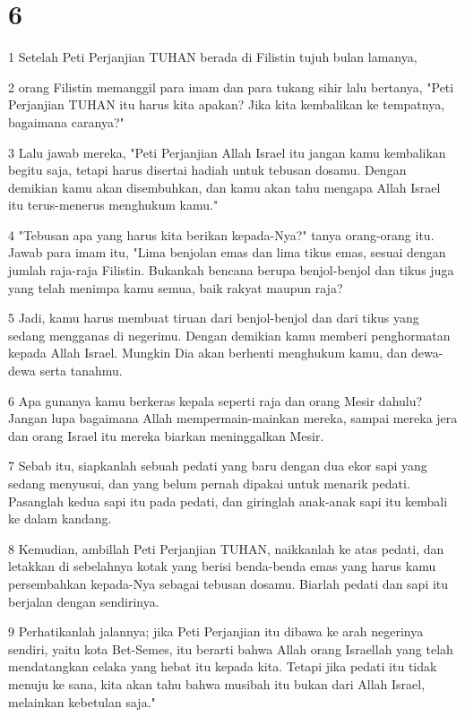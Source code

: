 \chapter{6}

\par 1 Setelah Peti Perjanjian TUHAN berada di Filistin tujuh bulan lamanya,
\par 2 orang Filistin memanggil para imam dan para tukang sihir lalu bertanya, "Peti Perjanjian TUHAN itu harus kita apakan? Jika kita kembalikan ke tempatnya, bagaimana caranya?"
\par 3 Lalu jawab mereka, "Peti Perjanjian Allah Israel itu jangan kamu kembalikan begitu saja, tetapi harus disertai hadiah untuk tebusan dosamu. Dengan demikian kamu akan disembuhkan, dan kamu akan tahu mengapa Allah Israel itu terus-menerus menghukum kamu."
\par 4 "Tebusan apa yang harus kita berikan kepada-Nya?" tanya orang-orang itu. Jawab para imam itu, "Lima benjolan emas dan lima tikus emas, sesuai dengan jumlah raja-raja Filistin. Bukankah bencana berupa benjol-benjol dan tikus juga yang telah menimpa kamu semua, baik rakyat maupun raja?
\par 5 Jadi, kamu harus membuat tiruan dari benjol-benjol dan dari tikus yang sedang mengganas di negerimu. Dengan demikian kamu memberi penghormatan kepada Allah Israel. Mungkin Dia akan berhenti menghukum kamu, dan dewa-dewa serta tanahmu.
\par 6 Apa gunanya kamu berkeras kepala seperti raja dan orang Mesir dahulu? Jangan lupa bagaimana Allah mempermain-mainkan mereka, sampai mereka jera dan orang Israel itu mereka biarkan meninggalkan Mesir.
\par 7 Sebab itu, siapkanlah sebuah pedati yang baru dengan dua ekor sapi yang sedang menyusui, dan yang belum pernah dipakai untuk menarik pedati. Pasanglah kedua sapi itu pada pedati, dan giringlah anak-anak sapi itu kembali ke dalam kandang.
\par 8 Kemudian, ambillah Peti Perjanjian TUHAN, naikkanlah ke atas pedati, dan letakkan di sebelahnya kotak yang berisi benda-benda emas yang harus kamu persembahkan kepada-Nya sebagai tebusan dosamu. Biarlah pedati dan sapi itu berjalan dengan sendirinya.
\par 9 Perhatikanlah jalannya; jika Peti Perjanjian itu dibawa ke arah negerinya sendiri, yaitu kota Bet-Semes, itu berarti bahwa Allah orang Israellah yang telah mendatangkan celaka yang hebat itu kepada kita. Tetapi jika pedati itu tidak menuju ke sana, kita akan tahu bahwa musibah itu bukan dari Allah Israel, melainkan kebetulan saja."
